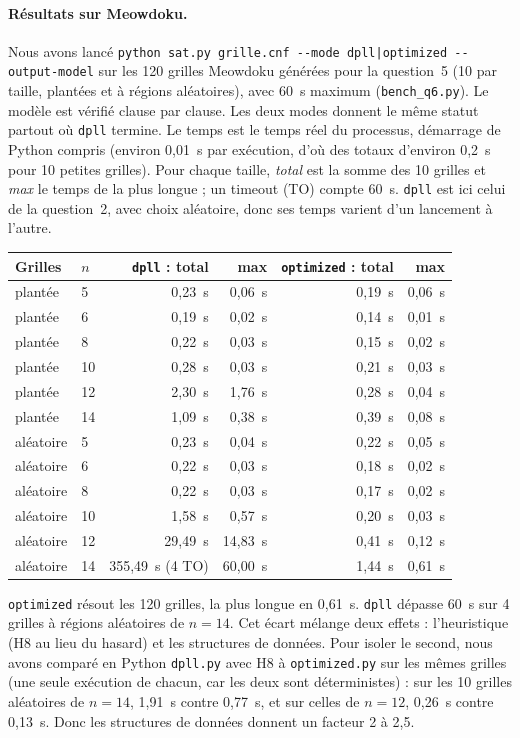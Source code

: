 \documentclass[11pt,a4paper]{article}
\newcommand{\f}[1]{\texttt{#1}}
\begin{document}
\paragraph{Résultats sur Meowdoku.} Nous avons lancé \f{python sat.py grille.cnf -{}-mode dpll|optimized -{}-output-model} sur les 120 grilles Meowdoku générées pour la question~5 (10 par taille, plantées et à régions aléatoires), avec 60~s maximum (\f{bench\_q6.py}). Le modèle est vérifié clause par clause. Les deux modes donnent le même statut partout où \f{dpll} termine. Le temps est le temps réel du processus, démarrage de Python compris (environ 0,01~s par exécution, d'où des totaux d'environ 0,2~s pour 10 petites grilles). Pour chaque taille, \emph{total} est la somme des 10 grilles et \emph{max} le temps de la plus longue ; un timeout (TO) compte 60~s. \f{dpll} est ici celui de la question~2, avec choix aléatoire, donc ses temps varient d'un lancement à l'autre.

\medskip
\begin{tabular}{llrrrr}
\toprule
Grilles & $n$ & \f{dpll} : total & max & \f{optimized} : total & max\\
\midrule
plantée & 5 & 0,23~s & 0,06~s & 0,19~s & 0,06~s \\
plantée & 6 & 0,19~s & 0,02~s & 0,14~s & 0,01~s \\
plantée & 8 & 0,22~s & 0,03~s & 0,15~s & 0,02~s \\
plantée & 10 & 0,28~s & 0,03~s & 0,21~s & 0,03~s \\
plantée & 12 & 2,30~s & 1,76~s & 0,28~s & 0,04~s \\
plantée & 14 & 1,09~s & 0,38~s & 0,39~s & 0,08~s \\
aléatoire & 5 & 0,23~s & 0,04~s & 0,22~s & 0,05~s \\
aléatoire & 6 & 0,22~s & 0,03~s & 0,18~s & 0,02~s \\
aléatoire & 8 & 0,22~s & 0,03~s & 0,17~s & 0,02~s \\
aléatoire & 10 & 1,58~s & 0,57~s & 0,20~s & 0,03~s \\
aléatoire & 12 & 29,49~s & 14,83~s & 0,41~s & 0,12~s \\
aléatoire & 14 & 355,49~s (4 TO) & 60,00~s & 1,44~s & 0,61~s \\
\bottomrule
\end{tabular}
\medskip

\f{optimized} résout les 120 grilles, la plus longue en 0,61~s. \f{dpll} dépasse 60~s sur 4 grilles à régions aléatoires de $n=14$. Cet écart mélange deux effets : l'heuristique (H8 au lieu du hasard) et les structures de données. Pour isoler le second, nous avons comparé en Python \f{dpll.py} avec H8 à \f{optimized.py} sur les mêmes grilles (une seule exécution de chacun, car les deux sont déterministes) : sur les 10 grilles aléatoires de $n=14$, 1,91~s contre 0,77~s, et sur celles de $n=12$, 0,26~s contre 0,13~s. Donc les structures de données donnent un facteur 2 à 2,5.
\end{document}

